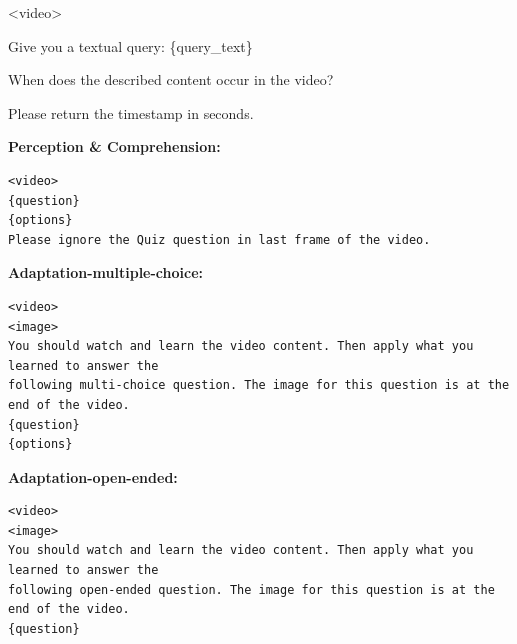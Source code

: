 \begin{tcolorbox}[
  title=Charades-STA,
  fonttitle=\bfseries,
  colframe=black,
  colback=white,
  toptitle=1mm,
  bottomtitle=1mm,
  top=2mm,
  verbatim,
]
<video>

Give you a textual query: \{query\_text\}

When does the described content occur in the video? 

Please return the timestamp in seconds.
\end{tcolorbox}

\begin{tcolorbox}[
  enhanced,
  title=VideoMMMU,
  fonttitle=\bfseries,
  colframe=black,
  colback=white,
  toptitle=1mm,
  bottomtitle=1mm,
  top=1mm,
  bottom=1mm,
  left=1mm,
  right=1mm,
  middle=1mm,
  segmentation style={solid, draw=black, line width=0.4pt}
]
\textbf{Perception \& Comprehension:}
\begin{Verbatim}
<video>
{question}
{options}
Please ignore the Quiz question in last frame of the video.
\end{Verbatim}

\tcblower %

\textbf{Adaptation-multiple-choice:}
\begin{Verbatim}
<video>
<image>
You should watch and learn the video content. Then apply what you learned to answer the 
following multi-choice question. The image for this question is at the end of the video.
{question}
{options}
\end{Verbatim}

\tcbline %

\textbf{Adaptation-open-ended:}
\begin{Verbatim}
<video>
<image>
You should watch and learn the video content. Then apply what you learned to answer the 
following open-ended question. The image for this question is at the end of the video.
{question}
\end{Verbatim}
\end{tcolorbox}

